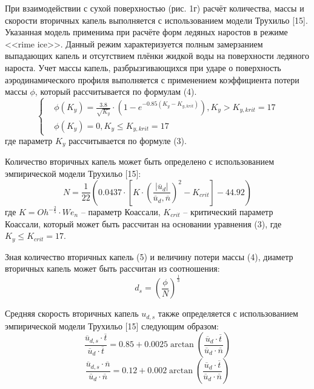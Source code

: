 \documentclass{psta}%
\begin{document}
При взаимодействии с сухой поверхностью (рис. 1г) расчёт количества, массы и скорости вторичных капель выполняется с использованием модели Трухильо [15].
Указанная модель применима при расчёте форм ледяных наростов в режиме <<rime ice>>.
Данный режим характеризуется полным замерзанием выпадающих капель и отсутствием плёнки жидкой воды на поверхности ледяного нароста.
Учет массы капель, разбрызгивающихся при ударе о поверхность аэродинамического профиля выполняется с применением коэффициента потери массы $\phi$, который рассчитывается по формулам (4).
\begin{equation}
	\begin{cases}
		& \phi(K_y) = \frac{3.8}{\sqrt{K_y}} \cdot \left( 1 - e^{-0.85 (K_y - K_{y,krit})} \right), K_y > K_{y,krit} = 17 \\
		& \phi(K_y) = 0, K_y \le K_{y,krit} = 17
	\end{cases}
\end{equation}
где параметр $K_y$ рассчитывается по формуле (3).

Количество вторичных капель может быть определено с использованием эмпирической модели Трухильо [15]:
\begin{equation}
	N = \frac{1}{22} \left( 0.0437 \cdot \left[ K \cdot \left( \frac{|\overline{u}_d|}{\overline{u}_d, \overline{n}} \right)^2 - K_{crit} \right] - 44.92 \right)
\end{equation}
где $K = Oh^{-\frac{2}{5}} \cdot We_n$ -- параметр Коассали, $K_{crit}$ -- критический параметр Коассали, который может быть рассчитан на основании уравнения (3), где $K_y \le K_{crit} = 17$.

Зная количество вторичных капель (5) и величину потери массы (4), диаметр вторичных капель может быть рассчитан из соотношения:
\begin{equation*}
	d_s = \left( \frac{\phi}{N} \right)^{\frac{1}{3}}
\end{equation*}

Средняя скорость вторичных капель $u_{d,s}$ также определяется с использованием эмпирической модели Трухильо [15] следующим образом:
\begin{equation}
	\frac{\overline{u}_{d,s} \cdot \overline{t}}{\overline{u}_d \cdot \overline{t}} = 0.85 + 0.0025 \arctan\left( \frac{\overline{u}_d \cdot \overline{t}}{\overline{u}_d \cdot \overline{n}} \right)
\end{equation}
\begin{equation}
	\frac{\overline{u}_{d,s} \cdot \overline{n}}{\overline{u}_d \cdot \overline{n}} = 0.12 + 0.002 \arctan\left( \frac{\overline{u}_d \cdot \overline{t}}{\overline{u}_d \cdot \overline{n}} \right)
\end{equation}
\end{document}
